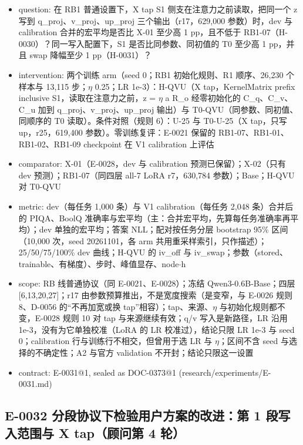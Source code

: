 \documentclass[11pt]{article}
\begin{document}
\begin{itemize}
\item question: 在 RB1 普通设置下，X tap S1 侧支在注意力之前读取，把同一个 z 写到 q\_proj、v\_proj、up\_proj 三个输出（r17，629,000 参数）时，dev 与 calibration 合并的宏平均是否比 X-01 至少高 1 pp，且不低于 RB1-07（H-0030）？同一写入配置下，S1 是否比同参数、同初值的 T0 至少高 1 pp，并且 swap 降幅至少 1 pp（H-0031）？
\item intervention: 两个训练 arm（seed 0；RB1 初始化规则、R1 顺序、26,230 个样本与 13,115 步；\ensuremath{\eta} 0.25；LR 1e-3）：H-QVU（X tap，KernelMatrix prefix inclusive S1，读取在注意力之前，z = \ensuremath{\eta} a R\_o 经零初始化的 C\_q、C\_v、C\_u 加到 q\_proj、v\_proj、up\_proj 输出）与 T0-QVU（同参数、同初值、同顺序的 T0 读取）。条件对照（规则 6）：U-25 与 T0-U-25（X tap，只写 up，r25，619,400 参数）。零训练复评：E-0021 保留的 RB1-07、RB1-01、RB1-02、RB1-09 checkpoint 在 V1 calibration 上评估
\item comparator: X-01（E-0028，dev 与 calibration 预测已保留）；X-02（只有 dev 预测）；RB1-07（同四层 all-7 LoRA r7，630,784 参数）；Base；H-QVU 对 T0-QVU
\item metric: dev（每任务 1,000 条）与 V1 calibration（每任务 2,048 条）合并后的 PIQA、BoolQ 准确率与宏平均（主：合并宏平均，先算每任务准确率再平均）；dev 单独的宏平均；答案 NLL；配对按任务分层 bootstrap 95\% 区间（10,000 次，seed 20261101，各 arm 共用重采样索引，只作描述）；25/50/75/100\% dev 曲线；H-QVU 的 iv\_off 与 iv\_swap；参数（stored、trainable、有梯度）、步时、峰值显存、node\ensuremath{\cdot}h
\item scope: RB 线普通协议（同 E-0021、E-0028）；冻结 Qwen3-0.6B-Base；四层 [6,13,20,27]；r17 由参数预算推出，不是宽度搜索（是变窄，与 E-0026 规则 8、D-0056 的``不再加宽或换 tap''相容）；tap、来源、\ensuremath{\eta} 与初始化规则都不变，E-0028 规则 10 对 tap 与来源继续有效；q/v 写入是新路径，LR 沿用 1e-3，没有为它单独校准（LoRA 的 LR 校准过），结论只限 LR 1e-3 与 seed 0；calibration 行与训练行不相交，但曾用于选 LR 与 \ensuremath{\eta}；区间不含 seed 与选择的不确定性；A2 与官方 validation 不开封；结论只限这一设置
\item contract: E-0031@1, sealed as DOC-0373@1 (research/experiments/E-0031.md)
\end{itemize}

\subsection*{E-0032 分段协议下检验用户方案的改进：第 1 段写入范围与 X tap（顾问第 4 轮）}
\end{document}
